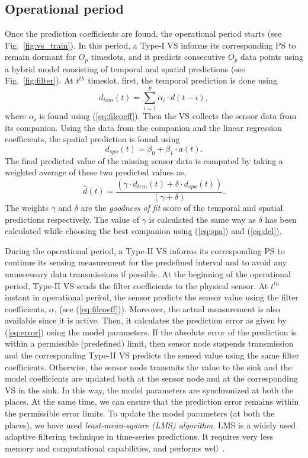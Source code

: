 \documentclass[a4paper,conference]{IEEEtran}
\begin{document}
\subsection{Operational period}
Once the prediction coefficients are found, the operational period starts (see Fig.~\ref{fig:vs_train}). In this period, a Type-I VS informs its corresponding PS to remain dormant for $O_{p}$ timeslots, and it predicts consecutive $O_{p}$ data points using a hybrid model consisting of temporal and spatial predictions (see Fig.~\ref{fig:filter}).
At $t^{th}$ timeslot, first, the temporal prediction is done using
\begin{equation}
d_{tem}(t) = \displaystyle\sum_{i=1}^{p}\alpha_{i}\cdot d(t-i),
\end{equation}
where $\alpha_{i}$ is found using (\ref{eq:filcoeff}). Then the VS collects the sensor data from its companion. Using the data from the companion and the linear regression coefficients, the spatial prediction is found using 
\begin{equation}
d_{spa}(t)  = \beta_{0} + \beta_{1}\cdot a(t).
\end{equation}
The final predicted value of the missing sensor data is computed by taking a weighted average of these two predicted values as,
\begin{equation}
\hat{d}(t)  =  \frac{(\gamma\cdot d_{tem}(t) + \delta\cdot d_{spa}(t))}{(\gamma + \delta)}. 
\label{eqn:gamdel}
\end{equation}
The weights $\gamma$ and $\delta$ are the {\it goodness of fit} score of the temporal and spatial predictions respectively. The value of $ \gamma $ is calculated the same way as $ \delta $ has been calculated while choosing the best companion using (\ref{eq:spa}) and (\ref{eq:del}).

During the operational period, a Type-II VS informs its corresponding PS to continue its sensing measurement for the predefined interval and to avoid any unnecessary data transmissions if possible. At the beginning of the operational period, Type-II VS sends the filter coefficients to the physical sensor. At $t^{th}$ instant in operational period, the sensor predicts the sensor value using the filter coefficients, $\underline{\alpha}$, (see (\ref{eq:filcoeff})). Moreover, the actual measurement is also available since it is active. Then, it calculates the prediction error as given by (\ref{eq:error}) using the model parameters. If the absolute error of the prediction is within a permissible (predefined) limit, then sensor node suspends transmission and the corresponding Type-II VS predicts the sensed value using the same filter coefficients. Otherwise, the sensor node transmits the value to the sink and the model coefficients are updated both at the sensor node and at the corresponding VS in the sink. In this way, the model parameters are synchronized at both the places. At the same time, we can ensure that the prediction error remains within the permissible error limits. To update the model parameters (at both the places), we have used {\it least-mean-square (LMS) algorithm}. LMS is a widely used adaptive filtering technique in time-series predictions. It requires very less memory and computational capabilities, and performs well~\cite{santini2006adaptive}.
 
\end{document}
